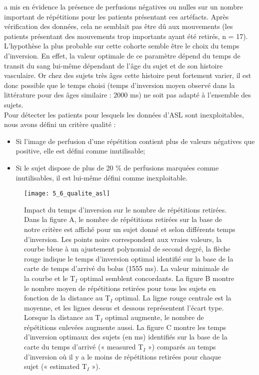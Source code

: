 a mis en évidence la présence de perfusions négatives ou nulles sur un nombre important de
répétitions pour les patients présentant ces artéfacts. Après vérification des données, cela ne semblait
pas être dû aux mouvements (les patients présentant des mouvements trop importants ayant été
retirés, n = 17). L’hypothèse la plus probable sur cette cohorte semble être le choix du temps
d’inversion. En effet, la valeur optimale de ce paramètre dépend du temps de transit du sang lui-même
dépendant de l’âge du sujet et de son histoire vasculaire. Or chez des sujets très âges cette histoire
peut fortement varier, il est donc possible que le temps choisi (temps d’inversion moyen observé dans
la littérature pour des âges similaire : 2000 ms) ne soit pas adapté à l’ensemble des sujets.\\
Pour détecter les patients pour lesquels les données d’ASL sont inexploitables, nous avons défini
un critère qualité :
\begin{itemize}
\item Si l’image de perfusion d’une répétition contient plus de valeurs négatives que positive, elle
est défini comme inutilisable;
\item Si le sujet dispose de plus de 20 \% de perfusions marquées comme inutilisables, il est lui-même
défini comme inexploitable.
\end{itemize}
\begin{figure}[!t]
\centering
\texttt{[image: 5\_6\_qualite\_asl]}
\caption{Impact du temps d'inversion sur le nombre de répétitions retirées. Dans la figure A, le nombre de répétitions
retirées sur la base de notre critère est affiché pour un sujet donné et selon différents temps d’inversion. Les points noirs
correspondent aux vraies valeurs, la courbe bleue à un ajustement polynomial de second degré, la flèche rouge indique le
temps d’inversion optimal identifié sur la base de la carte de temps d’arrivé du bolus (1555 ms). La valeur minimale de la
courbe et le T$_I$ optimal semblent concordants. La figure B montre le nombre moyen de répétitions retirées pour tous les
sujets en fonction de la distance au T$_I$ optimal. La ligne rouge centrale est la moyenne, et les lignes dessus et dessous
représentent l’écart type. Lorsque la distance au T$_I$ optimal augmente, le nombre de répétitions enlevées augmente aussi. La
figure C montre les temps d’inversion optimaux des sujets (en ms) identifiés sur la base de la carte du temps d’arrivé
(« measured T$_I$ ») comparés au temps d’inversion où il y a le moins de répétitions retirées pour chaque sujet (« estimated
T$_I$ »).}
\label{fig:5_6_qualite_asl}	
\end{figure}

